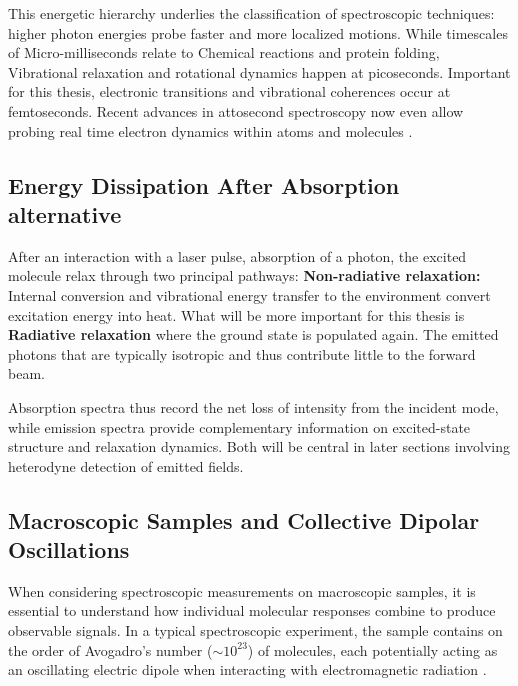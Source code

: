\noindent
This energetic hierarchy underlies the classification of spectroscopic techniques: higher photon energies probe faster and more localized motions.
While timescales of Micro-milliseconds relate to  Chemical reactions and protein folding, Vibrational relaxation and rotational dynamics happen at picoseconds. Important for this thesis, electronic transitions and vibrational coherences occur at femtoseconds. Recent advances in attosecond spectroscopy now even allow probing real time electron dynamics within atoms and molecules \cite{rupprechtetal2025tracinglonglivedatomic}.

\subsection{Energy Dissipation After Absorption alternative}

\noindent
After an interaction with a laser pulse, absorption of a photon, the excited molecule relax through two principal pathways:
\textbf{Non-radiative relaxation:} Internal conversion and vibrational energy transfer to the environment convert excitation energy into heat. What will be more important for this thesis is \textbf{Radiative relaxation} where the ground state is populated again. The emitted photons that are typically isotropic and thus contribute little to the forward beam.

\noindent
Absorption spectra thus record the net loss of intensity from the incident mode, while emission spectra provide complementary information on excited-state structure and relaxation dynamics. Both will be central in later sections involving heterodyne detection of emitted fields. 



\subsection{Macroscopic Samples and Collective Dipolar Oscillations}
\label{subsec:macroscopic_samples}

\noindent 
When considering spectroscopic measurements on macroscopic samples, it is essential to understand how individual molecular responses combine to produce observable signals. In a typical spectroscopic experiment, the sample contains on the order of Avogadro's number ($\sim 10^{23}$) of molecules, each potentially acting as an oscillating electric dipole when interacting with electromagnetic radiation \cite{feynman1965feynmanlecturesphysics}.

